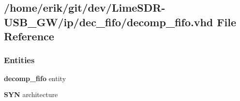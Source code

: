 \subsection{/home/erik/git/dev/\+Lime\+S\+D\+R-\/\+U\+S\+B\+\_\+\+G\+W/ip/dec\+\_\+fifo/decomp\+\_\+fifo.vhd File Reference}
\label{decomp__fifo_8vhd}
\subsubsection*{Entities}
\begin{DoxyCompactItemize}
\item 
{\bf decomp\+\_\+fifo} entity
\item 
{\bf S\+YN} architecture
\end{DoxyCompactItemize}

